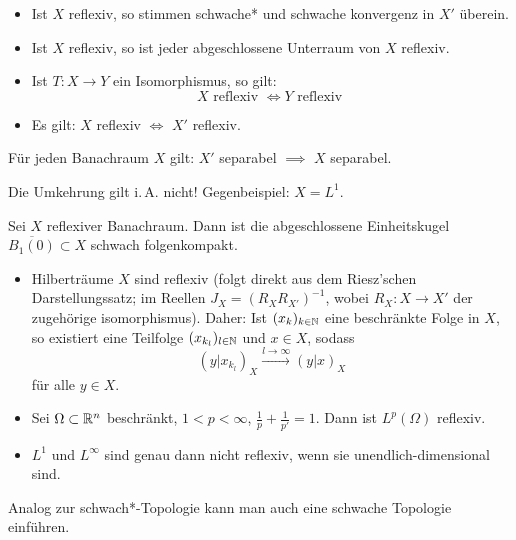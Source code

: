 \documentclass{cheat-sheet}
\begin{document}
\begin{lem}
  \begin{itemize}
    \item Ist $X$ reflexiv, so stimmen schwache* und schwache konvergenz in $X'$ überein.
    \item Ist $X$ reflexiv, so ist jeder abgeschlossene Unterraum von $X$ reflexiv.
    \item Ist $T : X \to Y$ ein Isomorphismus, so gilt:
      \[ X \text{ reflexiv } \iff Y \text{ reflexiv } \]
    \item Es gilt: $X$ reflexiv $\iff$ $X'$ reflexiv.
  \end{itemize}
\end{lem}

\begin{lem}
  Für jeden Banachraum $X$ gilt: $X'$ separabel $\implies$ $X$ separabel.
\end{lem}

\begin{bem}
  Die Umkehrung gilt i.\,A. nicht! Gegenbeispiel: $X = L^1$.
\end{bem}

\begin{satz}
  Sei $X$ reflexiver Banachraum. Dann ist die abgeschlossene Einheitskugel $\overline{B_1(0)} \subset X$ schwach folgenkompakt.
\end{satz}

\begin{bsp}
  \begin{itemize}
    \item Hilberträume $X$ sind reflexiv (folgt direkt aus dem Riesz'schen Darstellungssatz; im Reellen $J_X = (R_X R_{X'})^{-1}$, wobei $R_X : X \to X'$ der zugehörige isomorphismus). Daher: Ist $(x_k)_{k \in \mathbb{N}}$ eine beschränkte Folge in $X$, so existiert eine Teilfolge $(x_{k_l})_{l \in \mathbb{N}}$ und $x \in X$, sodass
    \[ (y | x_{k_l})_X \xrightarrow{l \to \infty} (y | x)_X \]
    für alle $y \in X$.
    \item Sei $\Omega \subset \mathbb{R}^n$ beschränkt, $1 < p < \infty$, $\tfrac{1}{p} + \tfrac{1}{p'} = 1$. Dann ist $L^p(\Omega)$ reflexiv.
    \item $L^1$ und $L^\infty$ sind genau dann nicht reflexiv, wenn sie unendlich-dimensional sind.
  \end{itemize}
\end{bsp}

\begin{bem}
  Analog zur schwach*-Topologie kann man auch eine schwache Topologie einführen.
\end{bem}
\end{document}

